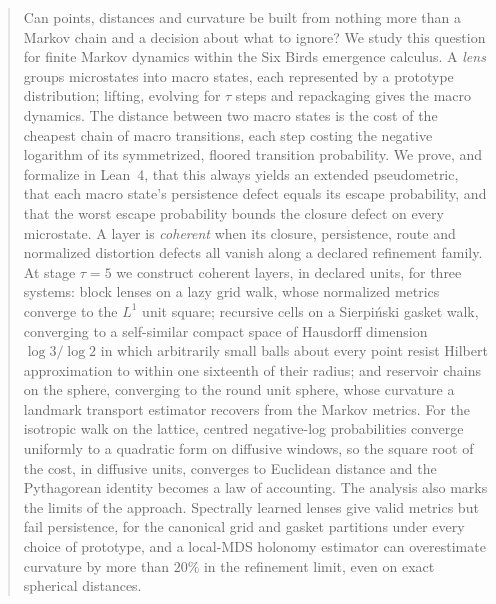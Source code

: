 \begin{abstract}
Can points, distances and curvature be built from nothing more than a Markov chain and a decision about what to ignore?
We study this question for finite Markov dynamics within the Six Birds emergence calculus.
A \emph{lens} groups microstates into macro states, each represented by a prototype distribution; lifting, evolving for $\tau$ steps and repackaging gives the macro dynamics.
The distance between two macro states is the cost of the cheapest chain of macro transitions, each step costing the negative logarithm of its symmetrized, floored transition probability.
We prove, and formalize in Lean~4, that this always yields an extended pseudometric, that each macro state's persistence defect equals its escape probability, and that the worst escape probability bounds the closure defect on every microstate.
A layer is \emph{coherent} when its closure, persistence, route and normalized distortion defects all vanish along a declared refinement family.
At stage $\tau=5$ we construct coherent layers, in declared units, for three systems: block lenses on a lazy grid walk, whose normalized metrics converge to the $L^1$ unit square; recursive cells on a Sierpi\'nski gasket walk, converging to a self-similar compact space of Hausdorff dimension $\log 3/\log 2$ in which arbitrarily small balls about every point resist Hilbert approximation to within one sixteenth of their radius; and reservoir chains on the sphere, converging to the round unit sphere, whose curvature a landmark transport estimator recovers from the Markov metrics.
For the isotropic walk on the lattice, centred negative-log probabilities converge uniformly to a quadratic form on diffusive windows, so the square root of the cost, in diffusive units, converges to Euclidean distance and the Pythagorean identity becomes a law of accounting.
The analysis also marks the limits of the approach.
Spectrally learned lenses give valid metrics but fail persistence, for the canonical grid and gasket partitions under every choice of prototype, and a local-MDS holonomy estimator can overestimate curvature by more than $20\%$ in the refinement limit, even on exact spherical distances.
\end{abstract}
